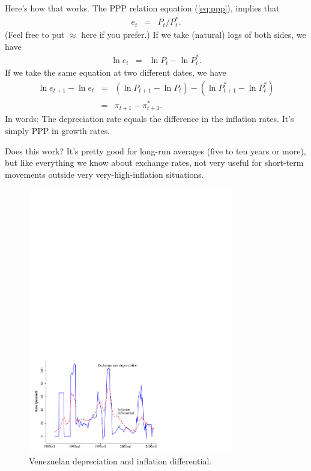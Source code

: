 Here's how that works.
The PPP relation  equation (\ref{eq:ppp}), implies that
\begin{eqnarray*}
    e_t &=& P_t/P_t^* .
\end{eqnarray*}
(Feel free to put $\approx$ here if you prefer.)
If we take (natural) logs of both sides, we have
\begin{eqnarray*}
    \ln e_t &=& \ln P_t - \ln P_t^* .
\end{eqnarray*}
If we take the same equation at two different dates,
we have
\begin{eqnarray*}
    \ln e_{t+1}-\ln e_{t} &=&
        (\ln P_{t+1}-\ln P_{t}) - (\ln P^{*}_{t+1}-\ln P^{*}_{t}) \\
                &=& \pi_{t+1} - \pi^*_{t+1} .
\end{eqnarray*}
In words:  The depreciation rate equals the difference in the inflation rates.
It's simply PPP in growth rates.


Does this work?
It's pretty good for long-run averages (five to ten years or more),
but like everything we know about exchange rates,
not very useful for short-term movements outside very
very-high-inflation situations.

\begin{figure}[h]
    \caption{Venezuelan depreciation and inflation differential.}
    \label{fig:venezuela}
    \centering
    \includegraphics[width=0.8\textwidth]{Figures/venezuela.pdf}
\end{figure}

